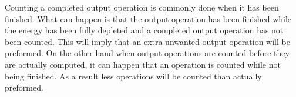 Counting a completed output operation is commonly done when it has been finished.
What can happen is that the output operation has been finished while the energy has been fully depleted and a completed output operation has not been counted.
This will imply that an extra unwanted output operation will be preformed.
On the other hand when output operations are counted before they are actually computed, it can happen that an operation is counted while not being finished.
As a result less operations will be counted than actually preformed.

